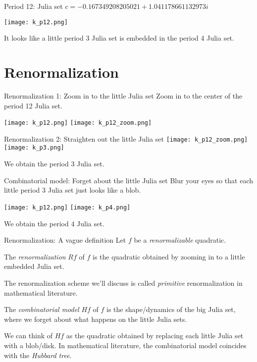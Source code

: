 \documentclass{beamer}
\begin{document}
\begin{frame}{Period 12: Julia set}
\centering
$c=-0.167349208205021+1.041178661132973i$

\texttt{[image: k\_p12.png]}

It looks like a little period 3 Julia set is embedded in the period 4 Julia set.
\end{frame}

\section{Renormalization}

\begin{frame}{Renormalization 1: Zoom in to the little Julia set}
\centering
Zoom in to the center of the period 12 Julia set.

\texttt{[image: k\_p12.png]}
\texttt{[image: k\_p12\_zoom.png]}
\end{frame}

\begin{frame}{Renormalization 2: Straighten out the little Julia set}
\centering
\texttt{[image: k\_p12\_zoom.png]}
\texttt{[image: k\_p3.png]}

We obtain the period 3 Julia set.
\end{frame}

\begin{frame}{Combinatorial model: Forget about the little Julia set}
\centering
Blur your eyes so that each little period 3 Julia set just looks like a blob.

\texttt{[image: k\_p12.png]}
\texttt{[image: k\_p4.png]}

We obtain the period 4 Julia set.
\end{frame}

\begin{frame}{Renormalization: A vague definition}
Let $f$ be a \emph{renormalizable} quadratic.
\begin{definition}
The \emph{renormalization} $Rf$ of $f$ is the quadratic obtained by zooming in to a little embedded Julia set.
\end{definition}
The renormalization scheme we'll discuss is called \emph{primitive} renormalization in mathematical literature.
\begin{definition}
The \emph{combinatorial model} $Hf$ of $f$ is the shape/dynamics of the big Julia set, where we forget about what happens on the little Julia sets.
\end{definition}
We can think of $Hf$ as the quadratic obtained by replacing each little Julia set with a blob/disk. In mathematical literature, the combinatorial model coincides with the \emph{Hubbard tree}.
\end{frame}
\end{document}
